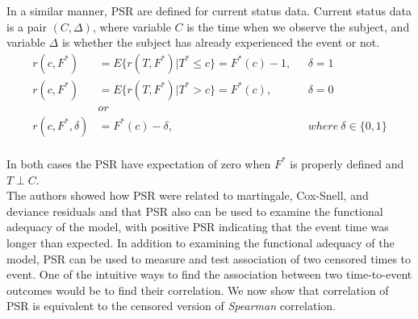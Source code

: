 \documentclass[]{article}
\begin{document}
In a similar manner, PSR are defined for current status data. Current status data is a pair $(C, \Delta)$, where variable $C$ is the time when we observe the subject, and variable $\Delta$ is whether the subject has already experienced the event or not. 
	$$
	\begin{aligned}
		r(c, F^*) &= E\{r(T,F^*)|T^*\leq c\} = F^*(c) - 1,~~~&\delta = 1 \\
		r(c, F^*) &= E\{r(T,F^*)|T^*>c\} = F^*(c) ,~~~&\delta = 0 \\
		&or\\
    r(c, F^*, \delta) &= F^*(c) - \delta,~~~&where~\delta \in \{0,1\}\\
	\end{aligned}
	$$

In both cases the PSR have expectation of zero when $F^*$ is properly defined and $T \perp C$.\\

The authors showed how PSR were related to martingale, Cox-Snell, and deviance residuals and that PSR also can be used to examine the functional adequacy of the model, with positive PSR indicating that the event time was longer than expected. In addition to examining the functional adequacy of the model, PSR can be used to measure and test association of two censored times to event. One of the intuitive ways to find the association between two time-to-event outcomes would be to find their correlation. We now show that correlation of PSR is equivalent to the censored version of \emph{Spearman} correlation.
\end{document}
